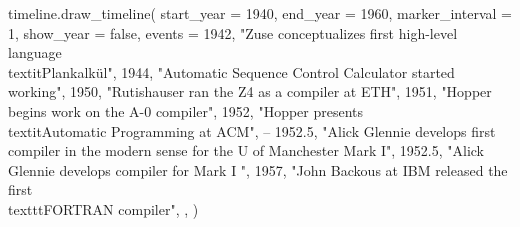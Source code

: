 \pagebreak
\begin{luacode}
timeline.draw_timeline({ 
    start_year = 1940,
    end_year = 1960,
    marker_interval = 1,
    show_year = false,
    events = {
        {1942, "Zuse conceptualizes first high-level language \\textit{Plankalkül}"},
        {1944, "Automatic Sequence Control Calculator started working"},
        {1950, "Rutishauser ran the Z4 as a compiler at ETH"},
        {1951, "Hopper begins work on the A-0 compiler"},
        {1952, "Hopper presents \\textit{Automatic Programming} at ACM"},
        -- {1952.5, "Alick Glennie develops first compiler in the modern sense for the U of Manchester Mark I"},
        {1952.5, "Alick Glennie develops compiler for Mark I "},
        {1957, "John Backous at IBM released the first \\texttt{FORTRAN} compiler"},
    },
})

\end{luacode}
